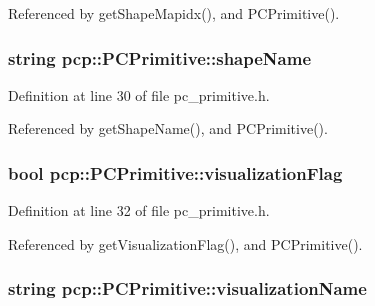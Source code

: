 Referenced by get\-Shape\-Mapidx(), and P\-C\-Primitive().

\hypertarget{classpcp_1_1PCPrimitive_a120d0dd6120b9fe1af74d698d40adb1c}{
\subsubsection[{shape\-Name}]{\setlength{\rightskip}{0pt plus 5cm}string pcp\-::\-P\-C\-Primitive\-::shape\-Name\hspace{0.3cm}{\ttfamily [private]}}}\label{classpcp_1_1PCPrimitive_a120d0dd6120b9fe1af74d698d40adb1c}


Definition at line 30 of file pc\-\_\-primitive.\-h.



Referenced by get\-Shape\-Name(), and P\-C\-Primitive().

\hypertarget{classpcp_1_1PCPrimitive_a44cc3f58388966da71e1b07b52d3081c}{
\subsubsection[{visualization\-Flag}]{\setlength{\rightskip}{0pt plus 5cm}bool pcp\-::\-P\-C\-Primitive\-::visualization\-Flag\hspace{0.3cm}{\ttfamily [private]}}}\label{classpcp_1_1PCPrimitive_a44cc3f58388966da71e1b07b52d3081c}


Definition at line 32 of file pc\-\_\-primitive.\-h.



Referenced by get\-Visualization\-Flag(), and P\-C\-Primitive().

\hypertarget{classpcp_1_1PCPrimitive_a8ac9332a85fb342e957959c97012f4d3}{
\subsubsection[{visualization\-Name}]{\setlength{\rightskip}{0pt plus 5cm}string pcp\-::\-P\-C\-Primitive\-::visualization\-Name\hspace{0.3cm}{\ttfamily [private]}}}\label{classpcp_1_1PCPrimitive_a8ac9332a85fb342e957959c97012f4d3}


